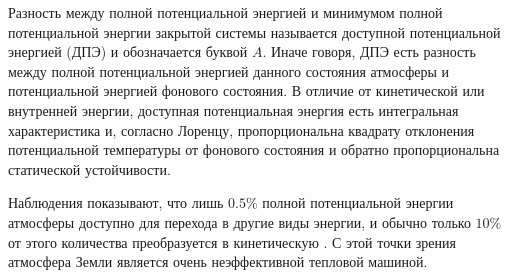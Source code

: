 \documentclass[12pt,a4paper]{report}
\begin{document}
Разность между полной потенциальной энергией и минимумом полной потенциальной энергии закрытой системы называется доступной потенциальной энергией (ДПЭ) и обозначается буквой $A$. Иначе говоря, ДПЭ есть разность между полной потенциальной энергией данного состояния атмосферы и потенциальной энергией фонового состояния. В отличие от кинетической или внутренней энергии, доступная потенциальная энергия есть интегральная характеристика и, согласно Лоренцу, пропорциональна квадрату отклонения потенциальной температуры от фонового состояния и обратно пропорциональна статической устойчивости. 

Наблюдения показывают, что лишь $0.5\%$ полной потенциальной энергии атмосферы доступно для перехода в другие виды энергии, и обычно только $10\%$ от этого количества преобразуется в кинетическую \citep{Holton2004}. С этой точки зрения атмосфера Земли является очень неэффективной тепловой машиной. 
\end{document}
